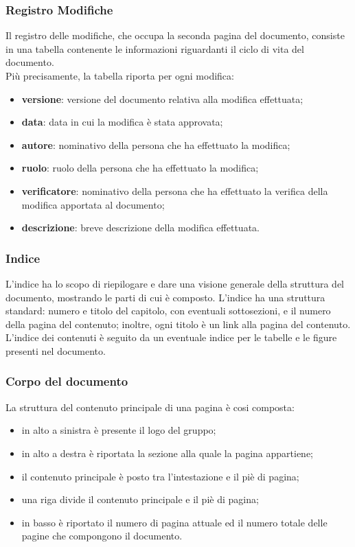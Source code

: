 \subsubsection{Registro Modifiche}\label{ProcessiDiSupportoDocumentazioneStrutturaGeneraleDeiDocumentiRegistroModifiche}
Il registro delle modifiche, che occupa la seconda pagina del documento, consiste in una tabella contenente le informazioni riguardanti il ciclo di vita del documento.
\\Più precisamente, la tabella riporta per ogni modifica:
\begin{itemize}
\item \textbf{versione}: versione del documento relativa alla modifica effettuata;
\item \textbf{data}: data in cui la modifica è stata approvata;
\item \textbf{autore}: nominativo della persona che ha effettuato la modifica;
\item \textbf{ruolo}: ruolo della persona che ha effettuato la modifica;
\item \textbf{verificatore}: nominativo della persona che ha effettuato la verifica della modifica apportata al documento;
\item \textbf{descrizione}: breve descrizione della modifica effettuata.
		
				
\end{itemize}
\subsubsection{Indice}\label{ProcessiDiSupportoDocumentazioneStrutturaGeneraleDeiDocumentiIndice}
L'indice ha lo scopo di riepilogare e dare una visione generale della struttura del documento, mostrando le parti di cui è composto. L'indice ha una struttura standard: numero e titolo del capitolo, con eventuali sottosezioni, e il numero della pagina del contenuto; inoltre, ogni titolo è un link alla pagina del contenuto. L'indice dei contenuti è seguito da un eventuale indice per le tabelle e le figure presenti nel documento.
\subsubsection{Corpo del documento}\label{ProcessiDiSupportoDocumentazioneStrutturaGeneraleDeiDocumentiCorpoDelDocumento}
La struttura del contenuto principale di una pagina è cosi composta:
\begin{itemize}
\item in alto a sinistra è presente il logo del gruppo;
	\item in alto a destra è riportata la sezione alla quale la pagina appartiene;
		\item il contenuto principale è posto tra l'intestazione e il piè di pagina;
			\item una riga divide il contenuto principale e il piè di pagina;
				\item in basso è riportato il numero di pagina attuale ed il numero totale delle pagine che compongono il documento.
\end{itemize}
